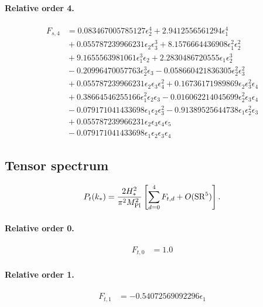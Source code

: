 \documentclass[10pt]{article}
\begin{document}
\paragraph{Relative order 4.}
\begin{align*}
F_{s,4} &= 0.083467005785127 \epsilon_{2}^{4} + 2.9412556561294 \epsilon_{1}^{4} \\
&{}  + 0.055787239966231 \epsilon_{2} \epsilon_{3}^{3} + 8.1576664436908 \epsilon_{1}^{2} \epsilon_{2}^{2} \\
&{}  + 9.1655563981061 \epsilon_{1}^{3} \epsilon_{2} + 2.2830486720555 \epsilon_{1} \epsilon_{2}^{3} \\
&{}  - 0.20996470057763 \epsilon_{2}^{3} \epsilon_{3} - 0.058660421836305 \epsilon_{2}^{2} \epsilon_{3}^{2} \\
&{}  + 0.055787239966231 \epsilon_{2} \epsilon_{3} \epsilon_{4}^{2} + 0.16736171989869 \epsilon_{2} \epsilon_{3}^{2} \epsilon_{4} \\
&{}  + 0.38664546255166 \epsilon_{1}^{2} \epsilon_{2} \epsilon_{3} - 0.016062214045699 \epsilon_{2}^{2} \epsilon_{3} \epsilon_{4} \\
&{}  - 0.079171041433698 \epsilon_{1} \epsilon_{2} \epsilon_{3}^{2} - 0.91389525644738 \epsilon_{1} \epsilon_{2}^{2} \epsilon_{3} \\
&{}  + 0.055787239966231 \epsilon_{2} \epsilon_{3} \epsilon_{4} \epsilon_{5} \\
&{}  - 0.079171041433698 \epsilon_{1} \epsilon_{2} \epsilon_{3} \epsilon_{4}
\end{align*}

\subsection{Tensor spectrum}
\[P_t(k_*)=\frac{2H_*^2}{\pi^2M_{\rm Pl}^2}\left[\sum_{d=0}^{4}F_{t,d}+O(\mathrm{SR}^{5})\right].\]
\paragraph{Relative order 0.}
\begin{align*}
F_{t,0} &= 1.0
\end{align*}

\paragraph{Relative order 1.}
\begin{align*}
F_{t,1} &=  - 0.54072569092296 \epsilon_{1}
\end{align*}
\end{document}
